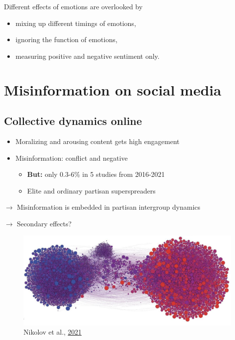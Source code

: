 \documentclass[
  letterpaper,
  DIV=11,
  numbers=noendperiod]{scrartcl}
\providecommand{\tightlist}{%
  \setlength{\itemsep}{0pt}\setlength{\parskip}{0pt}}\usepackage{longtable,booktabs,array}
\begin{document}
Different effects of emotions are overlooked by

\begin{itemize}
\item
  mixing up different timings of emotions,
\item
  ignoring the function of emotions,
\item
  measuring positive and negative sentiment only.
\end{itemize}

\hypertarget{misinformation-on-social-media}{%
\section{Misinformation on social
media}\label{misinformation-on-social-media}}

\hypertarget{collective-dynamics-online}{%
\subsection{Collective dynamics
online}\label{collective-dynamics-online}}

\begin{itemize}
\item
  Moralizing and arousing content gets high engagement
\item
  Misinformation: conflict and negative

  \begin{itemize}
  \tightlist
  \item
    \textbf{But:} only 0.3-6\% in 5 studies from 2016-2021
  \item
    Elite and ordinary partisan superspreaders
  \end{itemize}
\end{itemize}

\(\rightarrow\) Misinformation is embedded in partisan intergroup
dynamics

\(\rightarrow\) Secondary effects?

\begin{figure}

{\centering \includegraphics[width=6.25in,height=\textheight]{images/Nikolov.png}

}

\caption{Nikolov et al.,
\href{https://misinforeview.hks.harvard.edu/wp-content/uploads/2021/02/nikolov_partisanship_vulnerability_misinformation_20210215.pdf}{2021}}

\end{figure}
\end{document}
